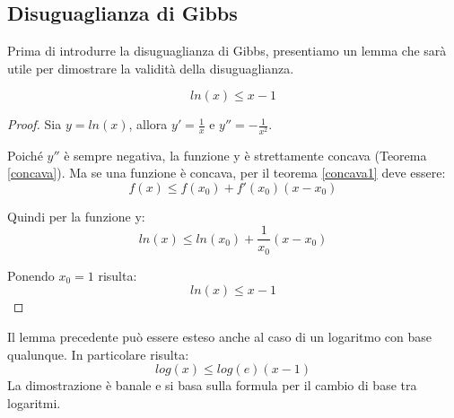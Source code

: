 \subsection{Disuguaglianza di Gibbs}
Prima di introdurre la disuguaglianza di Gibbs, presentiamo un lemma che sarà utile 
per dimostrare la validità della disuguaglianza.

\begin{lemma}

 \[ln(x) \le x-1 \] 
 \begin{proof}
  Sia $y=ln(x)$, allora $y'=\frac{1}{x}$ e $y''=-\frac{1}{x^2}$.

  Poiché $y''$ è sempre negativa, la funzione y è strettamente concava (Teorema \ref{concava}).
  Ma se una funzione è concava, per il teorema \ref{concava1} deve essere:
  \[ f(x) \le f(x_0) + f'(x_0)(x-x_0) \]
  
  Quindi per la funzione y:
  \[ ln(x) \le ln(x_0) + \frac{1}{x_0}(x-x_0) \]

  Ponendo $x_0=1$ risulta:
  \[ ln(x) \le x-1 \]
 \end{proof}
  \label{lemma_entr}
\end{lemma}

\begin{osservazione}
 Il lemma precedente può essere esteso anche al caso di un logaritmo con base qualunque.
 In particolare risulta:
 \[log(x) \le log(e)(x-1) \]
 La dimostrazione è banale e si basa sulla formula per il cambio di base tra logaritmi.
\end{osservazione}


